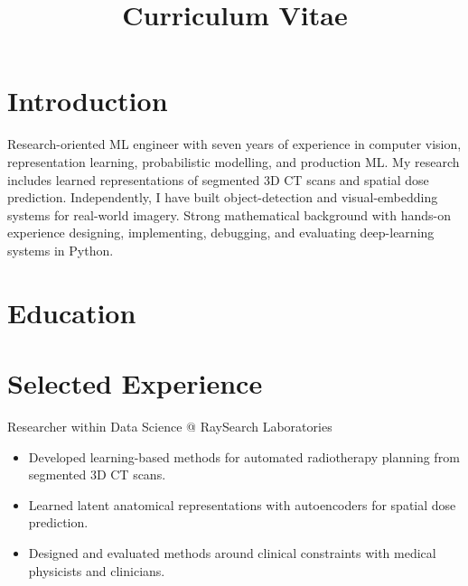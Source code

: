 \documentclass[11pt,a4paper]{moderncv}
\title{Curriculum Vitae}
\begin{document}
\makecvtitle

\section*{Introduction}

Research-oriented ML engineer with seven years of experience in computer vision, representation learning, probabilistic modelling, and production ML.
\newline\hspace*{2em}
My research includes learned representations of segmented 3D CT scans and spatial dose prediction. Independently, I have built object-detection and visual-embedding systems for real-world imagery.
\newline\hspace*{2em}
Strong mathematical background with hands-on experience designing, implementing, debugging, and evaluating deep-learning systems in Python.

\section{Education}




\section{Selected Experience}

\large{Researcher within Data Science @ RaySearch Laboratories}
\normalsize
\begin{itemize}
    \item Developed learning-based methods for automated radiotherapy planning from segmented 3D CT scans.
    \item Learned latent anatomical representations with autoencoders for spatial dose prediction.
    \item Designed and evaluated methods around clinical constraints with medical physicists and clinicians.
\end{itemize}
\end{document}
